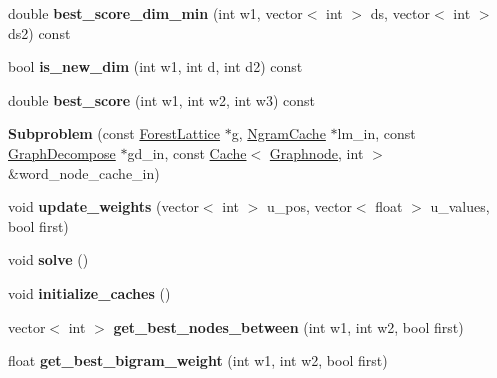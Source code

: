 \begin{DoxyCompactItemize}
\item 
\hypertarget{class_subproblem_a2e2a665cfdb9208f753eef143147d66c}{
double {\bfseries best\_\-score\_\-dim\_\-min} (int w1, vector$<$ int $>$ ds, vector$<$ int $>$ ds2) const }
\label{class_subproblem_a2e2a665cfdb9208f753eef143147d66c}

\item 
\hypertarget{class_subproblem_a2b43a2a68724d8eb624f6d81a7745b70}{
bool {\bfseries is\_\-new\_\-dim} (int w1, int d, int d2) const }
\label{class_subproblem_a2b43a2a68724d8eb624f6d81a7745b70}

\item 
\hypertarget{class_subproblem_a8359ae9db4d8a830d390312bc57eef6f}{
double {\bfseries best\_\-score} (int w1, int w2, int w3) const }
\label{class_subproblem_a8359ae9db4d8a830d390312bc57eef6f}

\item 
\hypertarget{class_subproblem_ae6b6a16e00079ebd5b56acbdfdaf3aab}{
{\bfseries Subproblem} (const \hyperlink{class_forest_lattice}{ForestLattice} $\ast$g, \hyperlink{class_ngram_cache}{NgramCache} $\ast$lm\_\-in, const \hyperlink{class_graph_decompose}{GraphDecompose} $\ast$gd\_\-in, const \hyperlink{class_cache}{Cache}$<$ \hyperlink{class_scarab_1_1_graph_1_1_graphnode}{Graphnode}, int $>$ \&word\_\-node\_\-cache\_\-in)}
\label{class_subproblem_ae6b6a16e00079ebd5b56acbdfdaf3aab}

\item 
\hypertarget{class_subproblem_adf6eb478907ed5c7c9f08a3cfcdfec76}{
void {\bfseries update\_\-weights} (vector$<$ int $>$ u\_\-pos, vector$<$ float $>$ u\_\-values, bool first)}
\label{class_subproblem_adf6eb478907ed5c7c9f08a3cfcdfec76}

\item 
\hypertarget{class_subproblem_a27c807a807f154ea28e7da7692466638}{
void {\bfseries solve} ()}
\label{class_subproblem_a27c807a807f154ea28e7da7692466638}

\item 
\hypertarget{class_subproblem_a8220595977ed219234d36dfadd0dde82}{
void {\bfseries initialize\_\-caches} ()}
\label{class_subproblem_a8220595977ed219234d36dfadd0dde82}

\item 
\hypertarget{class_subproblem_a9c57f3bd41e2788d9f393db8bbbe26ef}{
vector$<$ int $>$ {\bfseries get\_\-best\_\-nodes\_\-between} (int w1, int w2, bool first)}
\label{class_subproblem_a9c57f3bd41e2788d9f393db8bbbe26ef}

\item 
\hypertarget{class_subproblem_a3c426fd46fcacefc561b68f0fc111795}{
float {\bfseries get\_\-best\_\-bigram\_\-weight} (int w1, int w2, bool first)}
\label{class_subproblem_a3c426fd46fcacefc561b68f0fc111795}


\end{DoxyCompactItemize}
